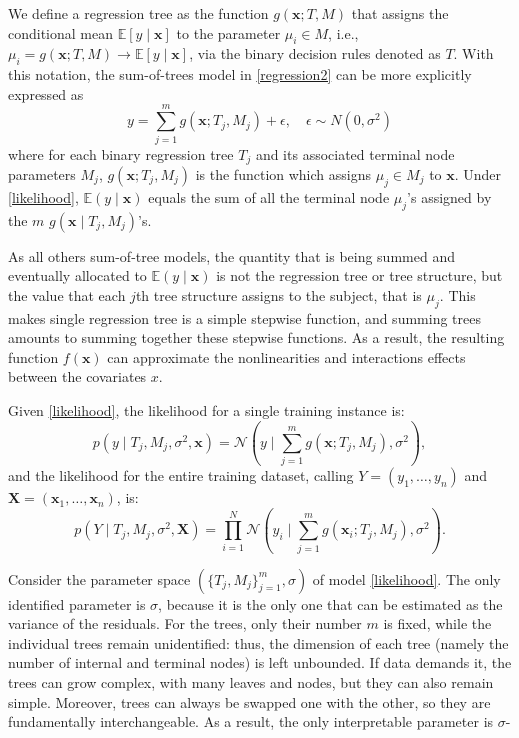 \documentclass[a4paper,11pt]{article}
\begin{document}
We define a regression tree as the function \( g(\mathbf{x}; T, M) \) that assigns the conditional mean \( \mathbb{E}[y \mid \mathbf{x}] \) to the parameter \( \mu_i \in M \), i.e., \( \mu_i = g(\mathbf{x}; T, M) \rightarrow \mathbb{E}[y \mid \mathbf{x}] \), via the binary decision rules denoted as \( T \). With this notation, the sum-of-trees model in \eqref{regression2} can be more explicitly expressed as
\begin{equation}
y= \sum_{j=1}^m g(\mathbf{x}; T_j, M_j) + \epsilon, \quad \epsilon \sim N(0, \sigma^2) \label{likelihood}
\end{equation}
where for each binary regression tree \( T_j \) and its associated terminal node parameters \( M_j \), \( g(\mathbf{x}; T_j, M_j) \) is the function which assigns \( \mu_{j} \in M_j \) to \( \mathbf{x} \). Under \eqref{likelihood}, \( \mathbb{E}(y \mid \mathbf{x}) \) equals the sum of all the terminal node \( \mu_{j} \)'s assigned by the $m$ \( g(\mathbf{x} \mid T_j, M_j) \)'s.

 As all others sum-of-tree models, the quantity that is being summed and eventually allocated to \( \mathbb{E}(y \mid \mathbf{x}) \) is not the regression tree or tree structure, but the value that each \( j \)th tree structure assigns to the subject, that is \( \mu_{j} \). This makes single regression tree is a simple stepwise function, and summing trees amounts to summing together these stepwise functions. As a result, the resulting function $f(\mathbf{x})$  can approximate the nonlinearities and interactions effects between the covariates $x$.


Given \eqref{likelihood}, the likelihood for a single training instance is:
\[
p(y \mid T_j, M_j, \sigma^2, \mathbf{x}) = \mathcal{N}\left(y \mid \sum_{j=1}^{m} g(\mathbf{x}; T_j, M_j), \sigma^2\right),
\]
and the likelihood for the entire training dataset, calling $Y= (y_1, \ldots, y_n)$ and $\mathbf{X} =(\mathbf{x}_1,\ldots, \mathbf{x}_n)$, is:
\[
p(Y \mid T_j, M_j, \sigma^2, \mathbf{X}) = \prod_{i=1}^{N} \mathcal{N}\left(y_i \mid \sum_{j=1}^{m} g(\mathbf{x}_i; T_j, M_j), \sigma^2\right).
\]

Consider the parameter space $(\{T_j, M_j\}_{j=1}^m, \sigma)$ of model \eqref{likelihood}. The only identified parameter is $\sigma$, because it is the only one that can be estimated as the variance of the residuals. For the trees, only their number $m$ is fixed, while the individual trees remain unidentified: thus, the dimension of each tree (namely the number of internal and terminal nodes) is left unbounded. If data demands it, the trees can grow complex, with many leaves and nodes, but they can also remain simple. Moreover, trees can always be swapped one with the other, so they are fundamentally interchangeable. As a result, the only interpretable parameter is $\sigma$-
\end{document}
